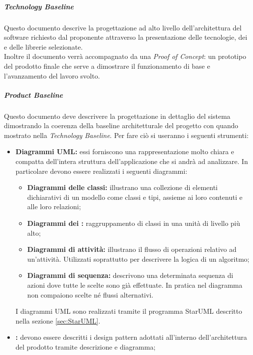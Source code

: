 		
			\subparagraph{Technology Baseline}
			\Spazio
			Questo documento descrive la progettazione ad alto livello dell'architettura del software richiesto dal proponente attraverso la presentazione delle tecnologie, dei  e delle librerie selezionate. \\
			Inoltre il documento verrà accompagnato da una \textit{Proof of Concept}: un prototipo del prodotto finale che serve a dimostrare il funzionamento di base e l'avanzamento del lavoro svolto. 

			\subparagraph{Product Baseline}
			\Spazio
			Questo documento deve descrivere la progettazione in dettaglio del sistema dimostrando la coerenza della baseline architetturale del progetto con quando mostrato nella \textit{Technology Baseline}.
			Per fare ciò si useranno i seguenti strumenti:
				\begin{itemize}
					\item \textbf{Diagrammi UML:}
					essi forniscono una rappresentazione molto chiara e compatta dell'intera struttura dell'applicazione che si andrà ad analizzare. In particolare devono essere realizzati i seguenti diagrammi:
					\begin{itemize}
						\item \textbf{Diagrammi delle classi:} illustrano una collezione di elementi dichiarativi di un modello come classi e tipi, assieme ai loro contenuti e alle loro relazioni;
						\item \textbf{Diagrammi dei :}  raggruppamento di classi in una unità di livello più alto;
						\item \textbf{Diagrammi di attività:} illustrano il flusso di operazioni relativo ad un'attività. Utilizzati soprattutto per descrivere la logica di un algoritmo;
						\item \textbf{Diagrammi di sequenza:} descrivono una determinata sequenza di azioni dove tutte le scelte sono già effettuate. In pratica nel diagramma non compaiono scelte né flussi alternativi.
					\end{itemize}
					I diagrammi UML sono realizzati tramite il programma StarUML descritto nella sezione \ref{sec:StarUML}.
					\item \textbf{:}
					devono essere descritti i design pattern adottati all'interno dell'architettura del prodotto tramite descrizione e diagramma;
				\end{itemize}
			
